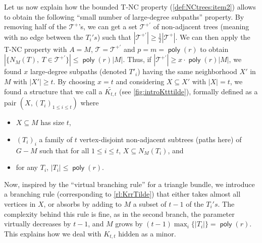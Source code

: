 \documentclass{amsart}
\newcommand{\mT}{\mathcal{T}}
\newcommand{\KttTilde}{\widetilde{K_{t,t}}}
\DeclareMathOperator\poly{\textsf{poly}}
\newcommand{\ruleref}[1]{\hyperref[#1]{\ref*{#1}}}
\begin{document}
Let us now explain how the bounded T-NC property (\autoref{def:NCtrees:item2}) allows to obtain 
the following ``small number of large-degree subpaths'' property. By removing half of the $\mT^+$'s, we can get a set $\mT^{+'}$ of non-adjacent trees (meaning with no edge between the $T_i's$) such that $|\mT^{+'}|\geq \frac 12|\mT^+|$. We can then apply the T-NC property with $A=M$, $\mT=\mT^{+'}$ and $p=m=\poly(r)$ to obtain
$|\{N_M(T),~T \in \mT^{+'} \}| \leq \poly(r)|M|$.
Thus, if $|\mT^{+'}| \ge x \cdot \poly(r)|M|$, we found $x$ large-degree subpaths (denoted $T'_i$) having the same neighborhood $X'$ in $M$ with $|X'|\geq t$.  By choosing $x=t$ and considering $X\subseteq X'$ with $|X|=t$, we found a structure that we call a $\KttTilde$ (see \autoref{fig:introKtttilde}), formally defined as a pair $\left(X, (T_i)_{1\leq i \leq t}\right)$ where
\begin{itemize}
    \item $X\subseteq M$ has size $t$, 
    \item  $(T_i)_i$ a family of $t$ vertex-disjoint non-adjacent subtrees (paths here) of $G - M$ such that for all $1\leq i \leq t$, $X\subseteq N_M(T_i)$, and
    \item for any $T_i$, $|T_i| \le \poly(r)$.
\end{itemize}
Now, inspired by the ``virtual branching rule'' for a triangle bundle, we introduce a branching rule (corresponding to \ruleref{rl:KrrTilde}) that either takes almost all vertices in $X$, or absorbs by adding to $M$ a subset of $t-1$ of the $T_i's$. The complexity behind this rule is fine, as in the second branch, the parameter virtually decreases by $t-1$, and $M$ grows by $(t-1)\max_i\{|T_i|\} = \poly(r)$.
This explains how we deal with $K_{t,t}$ hidden as a minor.
\end{document}
